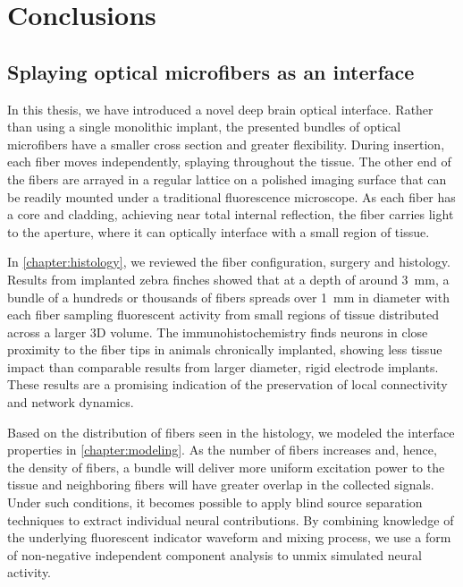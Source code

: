 \chapter{Conclusions}
\label{chapter:Conclusions}

\thispagestyle{myheadings}

\graphicspath{{7_Conclusion/Figures/}}


\section{Splaying optical microfibers as an interface}

In this thesis, we have introduced a novel deep brain 
optical interface. Rather than using a single monolithic 
implant, the presented bundles of optical microfibers 
have a smaller cross section and greater flexibility. 
During insertion, each fiber moves independently, 
splaying throughout the tissue. The other end of the 
fibers are arrayed in a regular lattice on a polished 
imaging surface that can be readily mounted under a 
traditional fluorescence microscope. As each fiber has a 
core and cladding, achieving near total internal 
reflection, the fiber carries light to the aperture, 
where it can optically interface with a small region 
of tissue.

In \cref{chapter:histology}, we reviewed the fiber 
configuration, surgery and histology. Results from 
implanted zebra finches showed that at a depth of around 
3~mm, a bundle of a hundreds or thousands of fibers 
spreads over 1~mm in diameter with each fiber sampling 
fluorescent activity from small regions of tissue 
distributed across a larger 3D volume. The 
immunohistochemistry finds neurons in close proximity 
to the fiber tips in animals chronically implanted, 
showing less tissue impact than comparable results 
from larger diameter, rigid electrode implants. 
These results are a promising indication of the 
preservation of local connectivity and network 
dynamics.

Based on the distribution of fibers seen in the 
histology, we modeled the interface properties 
in \cref{chapter:modeling}. As the number of fibers 
increases and, hence, the density of fibers, a 
bundle will deliver more uniform excitation power 
to the tissue and neighboring fibers will have 
greater overlap in the collected signals. Under 
such conditions, it becomes possible to apply 
blind source separation techniques to extract 
individual neural contributions. By combining 
knowledge of the underlying fluorescent indicator 
waveform and mixing process, we use a form of 
non-negative independent component analysis to 
unmix simulated neural activity.

